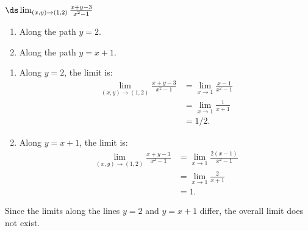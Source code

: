 {$\ds \lim_{(x,y)\to(1,2)} \frac{x+y-3}{x^2-1}$
\begin{enumerate}
	\item Along the path $y=2$.
	\item Along the path $y=x+1$.
\end{enumerate}}
{\begin{enumerate}
	\item Along $y=2$, the limit is: 
	\begin{align*}
	\lim_{(x,y)\to(1,2)} \frac{x+y-3}{x^2-1} & =  \lim_{x\to 1} \frac{x-1}{x^2-1}\\
							&= \lim_{x\to 1} \frac{1}{x+1}\\
							&= 1/2.
			\end{align*}
	\item	Along $y=x+1$, the limit is:
	\begin{align*}
   \lim_{(x,y)\to(1,2)} \frac{x+y-3}{x^2-1} & =  \lim_{x\to 1} \frac{2(x-1)}{x^2-1}\\
							&= \lim_{x\to 1} \frac{2}{x+1}\\
							&= 1.
			\end{align*}
\end{enumerate}
Since the limits along the lines $y=2$ and $y=x+1$ differ, the overall limit does not exist.
}
